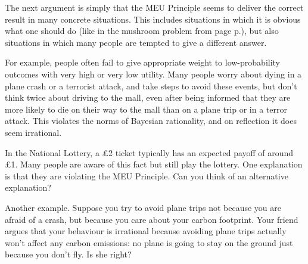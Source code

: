 The next argument is simply that the MEU Principle seems to deliver
the correct result in many concrete situations. This includes
situations in which it is obvious what one should do (like in the
mushroom problem from page p.\pageref{ex:mushroom}), but also
situations in which many people are tempted to give a different
answer.



For example, people often fail to give appropriate weight to
low-probability outcomes with very high or very low utility. Many
people worry about dying in a plane crash or a terrorist attack, and
take steps to avoid these events, but don't think twice about driving
to the mall, even after being informed that they are more likely to
die on their way to the mall than on a plane trip or in a terror
attack. This violates the norms of Bayesian rationality, and on
reflection it does seem irrational.

\begin{exercise}{1}
  In the National Lottery, a £2 ticket typically has an expected
  payoff of around £1. Many people are aware of this fact but still
  play the lottery. One explanation is that they are violating the MEU
  Principle. Can you think of an alternative explanation?
\end{exercise}

Another example. Suppose you try to avoid plane trips not because you
are afraid of a crash, but because you care about your carbon
footprint. Your friend argues that your behaviour is irrational
because avoiding plane trips actually won't affect any carbon
emissions: no plane is going to stay on the ground just because you
don't fly. Is she right?

